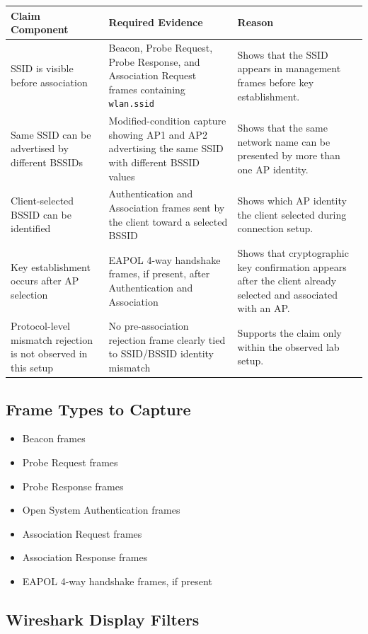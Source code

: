 \documentclass[12pt,a4paper]{article}
\begin{document}
\begin{longtable}{|p{4cm}|p{5cm}|p{5cm}|}
\hline
\textbf{Claim Component} & \textbf{Required Evidence} & \textbf{Reason} \\
\hline
SSID is visible before association &
Beacon, Probe Request, Probe Response, and Association Request frames containing \texttt{wlan.ssid} &
Shows that the SSID appears in management frames before key establishment. \\
\hline
Same SSID can be advertised by different BSSIDs &
Modified-condition capture showing AP1 and AP2 advertising the same SSID with different BSSID values &
Shows that the same network name can be presented by more than one AP identity. \\
\hline
Client-selected BSSID can be identified &
Authentication and Association frames sent by the client toward a selected BSSID &
Shows which AP identity the client selected during connection setup. \\
\hline
Key establishment occurs after AP selection &
EAPOL 4-way handshake frames, if present, after Authentication and Association &
Shows that cryptographic key confirmation appears after the client already selected and associated with an AP. \\
\hline
Protocol-level mismatch rejection is not observed in this setup &
No pre-association rejection frame clearly tied to SSID/BSSID identity mismatch &
Supports the claim only within the observed lab setup. \\
\hline
\end{longtable}

\subsection{Frame Types to Capture}

\begin{itemize}
    \item Beacon frames
    \item Probe Request frames
    \item Probe Response frames
    \item Open System Authentication frames
    \item Association Request frames
    \item Association Response frames
    \item EAPOL 4-way handshake frames, if present
\end{itemize}

\subsection{Wireshark Display Filters}
\end{document}
